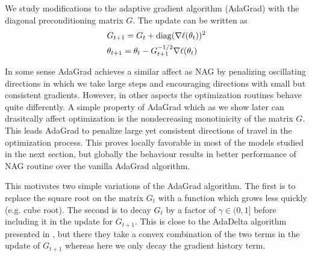 We study modifications to the adaptive gradient algorithm (AdaGrad) with the
diagonal preconditioning matrix $G$. The update can be written as
\begin{equation}
\begin{aligned}
&G_{t+1} = G_{t} + \operatorname*{diag}(\nabla \ell (\theta_t))^2 \\
&\theta_{t+1} = \theta_t - G_{t+1}^{-1/2} \nabla \ell(\theta_t)
\end{aligned} 
\end{equation}

In some sense AdaGrad achieves a similar affect as NAG by penalizing
oscillating directions in which we take large steps and encouraging directions
with small but consistent gradients. However, in other aspects the optimization
routines behave quite differently. A simple property of AdaGrad which as we
show later can drasitcally affect optimization is the nondecreasing
monotinicity of the matrix $G$. This leads AdaGrad to penalize large yet
consistent directions of travel in the optimization process. This proves
locally favorable in most of the models studied in the next section, but
globally the behaviour results in better performance of NAG routine over the
vanilla AdaGrad algorithm.

This motivates two simple variations of the AdaGrad algorithm. The first is to
replace the square root on the matrix $G_t$ with a function which grows less
quickly (e.g. cube root). The second is to decay $G_t$ by a factor of $\gamma
\in (0,1]$ before including it in the update for $G_{t+1}$. This is close to
the AdaDelta algorithm presented in \cite{zeiler_2012}, but there they take a
convex combination of the two terms in the update of $G_{t+1}$ whereas here we
only decay the gradient history term.

